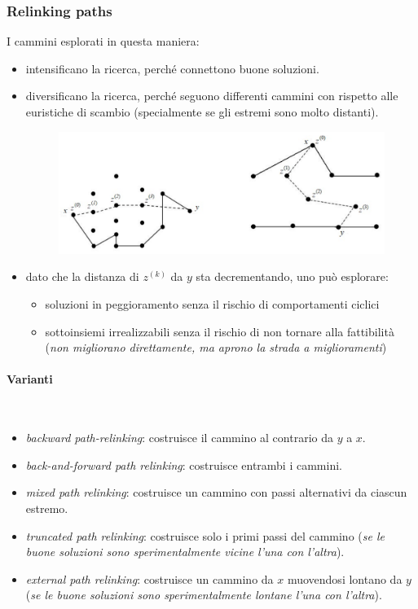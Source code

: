 \documentclass{article}
\begin{document}
\subsubsection{Relinking paths}
I cammini esplorati in questa maniera:
\begin{itemize}
    \item intensificano la ricerca, perché connettono buone soluzioni.
    \item diversificano la ricerca, perché seguono differenti cammini con
    rispetto alle euristiche di scambio (specialmente se gli estremi sono
    molto distanti).
    \begin{figure}[H]
        \centering
        \includegraphics[scale=0.5]{images/relin_paths.png}
    \end{figure}
    \item dato che la distanza di $z^{(k)}$ da $y$ sta decrementando, uno può esplorare:
    \begin{itemize}
        \item soluzioni in peggioramento senza il rischio di comportamenti ciclici
        \item sottoinsiemi irrealizzabili senza il rischio di non tornare alla fattibilità
        (\textit{non migliorano direttamente, ma aprono la strada a miglioramenti})
    \end{itemize}
\end{itemize}

\paragraph{Varianti}\mbox{}\\
\begin{itemize}
    \item \textit{backward path-relinking}: costruisce il cammino al contrario da $y$ a $x$.
    \item \textit{back-and-forward path relinking}: costruisce entrambi i cammini.
    \item \textit{mixed path relinking}: costruisce un cammino con passi alternativi
    da ciascun estremo.
    \item \textit{truncated path relinking}: costruisce solo i primi passi del cammino
    (\textit{se le buone soluzioni sono sperimentalmente vicine l'una con l'altra}).
    \item \textit{external path relinking}: costruisce un cammino da $x$ muovendosi lontano da $y$
    (\textit{se le buone soluzioni sono sperimentalmente lontane l'una con l'altra}).
\end{itemize}
\end{document}
